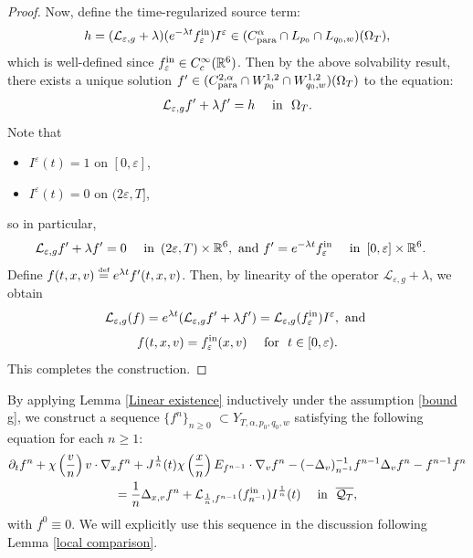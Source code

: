 \documentclass[reqno,11pt,final]{amsart}
\theoremstyle{plain}
\numberwithin{equation}{section}
\numberwithin{theorem}{section}
\newcommand{\eqdef }{\overset{\mbox{\tiny{def}}}{=}}
\begin{document}
\begin{proof}
Now, define the time-regularized source term:
\begin{align*}
h = (\mathcal{L}_{\varepsilon,g} + \lambda)(e^{-\lambda t} f^\textup{in}_\varepsilon)I^\varepsilon \in (C^\alpha_\textup{para} \cap L_{p_0} \cap L_{q_0,w})(\Omega_T),
\end{align*}which is well-defined since $f^\textup{in}_\varepsilon\in C^\infty_c(\mathbb{R}^6)$. Then by the above solvability result, there exists a unique solution $f'\in (C_\textup{para}^{2,\alpha}\cap W^{1,2}_{p_0} \cap W_{q_0,w}^{1,2})(\Omega_T)$ to the equation:
\begin{align*}
\mathcal{L}_{\varepsilon,g} f' + \lambda f' = h \quad \textup{ in }\,\, \Omega_T.
\end{align*}Note that
\begin{itemize}
\item $I^\varepsilon(t) = 1$ on $[0,\varepsilon]$,
\item $I^\varepsilon(t) = 0$ on $(2\varepsilon, T]$,
\end{itemize}so in particular,
\begin{align*}
\mathcal{L}_{\varepsilon,g} f' + \lambda f' = 0\quad &\textup{ in } \left(2\varepsilon, T\right)\times\mathbb{R}^6,\textup{ and }
f' = e^{-\lambda t}f^\textup{in}_\varepsilon\quad \textup{ in } \left[0, \varepsilon\right]\times\mathbb{R}^6.
\end{align*}Define $f(t,x,v) \eqdef e^{\lambda t}f'(t,x,v)$. Then, by linearity of the operator $\mathcal{L}_{\varepsilon,g}+\lambda$, we obtain
\begin{align*}
\mathcal{L}_{\varepsilon,g}(f) = e^{\lambda t}(\mathcal{L}_{\varepsilon,g} f' + \lambda f') = \mathcal{L}_{\varepsilon,g}(f^\textup{in}_\varepsilon)I^\varepsilon,\textup{ and }
\end{align*}  
\begin{equation}\label{f equals fin}
f(t,x,v) = f^\textup{in}_\varepsilon(x,v) \quad \textup{ for }\,\,t\in[0,\varepsilon).
\end{equation}This completes the construction.
\end{proof}

\label{sequence}By applying Lemma \ref{Linear existence} inductively under the assumption \eqref{bound g}, we construct a sequence $\{f^n\}_{n\ge0}$ $\subset Y_{T,\alpha,p_0,q_0,w}$ satisfying the following equation for each $n\ge1$:
\begin{multline}\label{n approx}
\partial_tf^n + \chi\left(\frac{v}{n}\right)v\cdot\nabla_xf^n + J^{\frac{1}{n}}(t)\chi\left(\frac{x}{n}\right)E_{f^{n-1}}\cdot\nabla_vf^n - (-\Delta_v)_{n^{-1}}^{-1}f^{n-1} \Delta_vf^n - f^{n-1} f^n \\
 =\frac{1}{n}\Delta_{x,v} f^n + \mathcal{L}_{\frac{1}{n}, f^{n-1}}(f^\textup{in}_{n^{-1}})I^{\frac{1}{n}}(t) \quad \textup{ in }\,\, \overline{\mathcal{Q}_T},
\end{multline}with $f^0 \equiv 0$. We will explicitly use this sequence in the discussion following Lemma \ref{local comparison}.
\end{document}
